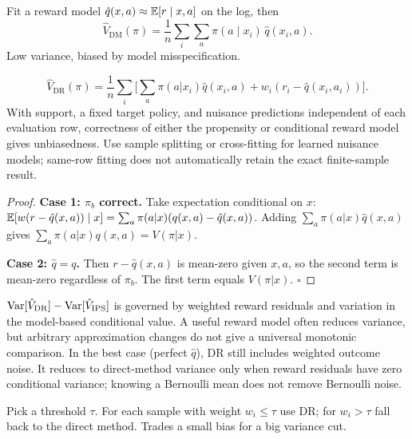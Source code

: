 \documentclass[11pt,oneside]{scrbook}
\begin{document}
\begin{definition}
Fit a reward model $\hat q(x, a) \approx \mathbb{E}[r \mid x, a]$ on the log, then
\[
\hat V_{\mathrm{DM}}(\pi) = \frac{1}{n}\sum_i \sum_a \pi(a \mid x_i)\, \hat q(x_i, a).
\]
Low variance, biased by model misspecification.
\end{definition}

\begin{theorem}
\[
\hat V_{\mathrm{DR}}(\pi) = \frac{1}{n}\sum_i\Big[\sum_a \pi(a|x_i)\hat q(x_i, a) + w_i (r_i - \hat q(x_i, a_i))\Big].
\]
With support, a fixed target policy, and nuisance predictions independent of each evaluation row, correctness of either the propensity or conditional reward model gives unbiasedness. Use sample splitting or cross-fitting for learned nuisance models; same-row fitting does not automatically retain the exact finite-sample result.
\end{theorem}

\begin{proof}
\textbf{Case 1: $\pi_b$ correct.} Take expectation conditional on $x$:
$\mathbb{E}[w (r - \hat q(x, a)) \mid x] = \sum_a \pi(a|x)(q(x,a) - \hat q(x,a))$.
Adding $\sum_a \pi(a|x)\hat q(x,a)$ gives $\sum_a \pi(a|x) q(x,a) = V(\pi|x)$.

\textbf{Case 2: $\hat q = q$.} Then $r - \hat q(x, a)$ is mean-zero given
$x, a$, so the second term is mean-zero regardless of $\pi_b$. The first
term equals $V(\pi|x)$. $\square$
\end{proof}

\begin{remark}[DR variance]
$\operatorname{Var}[\hat V_{\mathrm{DR}}] - \operatorname{Var}[\hat V_{\mathrm{IPS}}]$ is governed by
weighted reward residuals and variation in the model-based conditional value. A useful reward model often reduces variance, but arbitrary approximation changes do not give a universal monotonic comparison. In the best case (perfect $\hat q$), DR
still includes weighted outcome noise. It reduces to direct-method variance only when reward residuals have zero conditional variance; knowing a Bernoulli mean does not remove Bernoulli noise.
\end{remark}

\begin{definition}
Pick a threshold $\tau$. For each sample with weight $w_i \leq \tau$ use DR;
for $w_i > \tau$ fall back to the direct method. Trades a small bias for a
big variance cut.
\end{definition}
\end{document}
